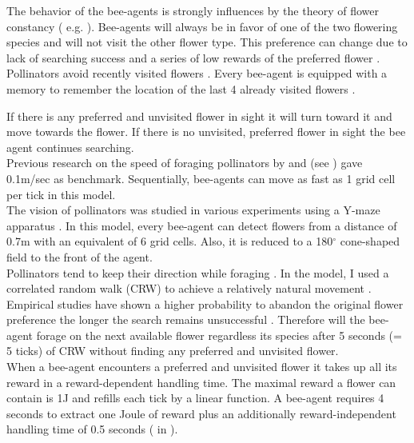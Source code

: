 The behavior of the bee-agents is strongly influences by the theory of flower constancy ( e.g.  \citealp{bobisud1975pollinator, chittka1997foraging, thomson1981field, chittka1999flower,  goulson1994model,  goulson1999foraging}). Bee-agents will always be in favor of one of the two flowering species and will not visit the other flower type. This preference can change due to lack of searching success and a series of low rewards of the preferred flower \citep{chittka1997foraging}. Pollinators avoid recently visited flowers \citep{goulson1999foraging}. Every bee-agent is equipped with a memory to remember the location of the last 4 already visited flowers \citep{goulson2000pollinators}.

If there is any preferred and unvisited flower in sight it will turn toward it and move towards the flower. If there is no unvisited, preferred flower in sight the bee agent continues searching. \\

Previous research on the speed of foraging pollinators by \cite{essenberg2012explaining} and \cite{kunin1991few} (see  \citealt{kunin1996pollinator}) gave 0.1m/sec as benchmark. Sequentially, bee-agents can move as fast as 1 grid cell per tick in this model. \\

The vision of pollinators was studied in various experiments using a Y-maze apparatus \citep{dyer2008comparative, wertlen2008detection, ne2001effect}. In this model, every bee-agent can detect flowers from a distance of 0.7m with an equivalent of 6 grid cells. Also, it is reduced to a 180$^{\circ}$ cone-shaped field to the front of the agent.\\

Pollinators tend to keep their direction while foraging \citep{waddington1980flight}. In the model, I used a correlated random walk (CRW) to achieve a relatively natural  movement \citep{bartumeus2005animal, codling2008random,  pyke1992flight, viswanathan2008levy}. \\

Empirical studies have shown a higher probability to abandon the original flower preference the longer the search remains unsuccessful \citep{chittka1997foraging}. Therefore will the bee-agent forage on the next available flower regardless its species after 5 seconds (= 5 ticks) of CRW without finding any preferred and unvisited flower. \\

When a bee-agent encounters a preferred and unvisited flower it takes up all its reward in a reward-dependent handling time. The maximal reward a flower can contain is 1J and refills each tick by a linear function.  A bee-agent requires 4 seconds to extract one Joule of reward plus an additionally reward-independent handling time of 0.5 seconds (\citealt{roubik1992ecology} in  \citealt{kunin1996pollinator}). 

